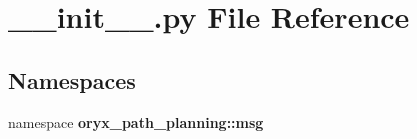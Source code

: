 \section{\-\_\-\-\_\-init\-\_\-\-\_\-.\-py \-File \-Reference}
\label{msg_2____init_____8py}
\subsection*{\-Namespaces}
\begin{DoxyCompactItemize}
\item 
namespace {\bf oryx\-\_\-path\-\_\-planning\-::msg}
\end{DoxyCompactItemize}
